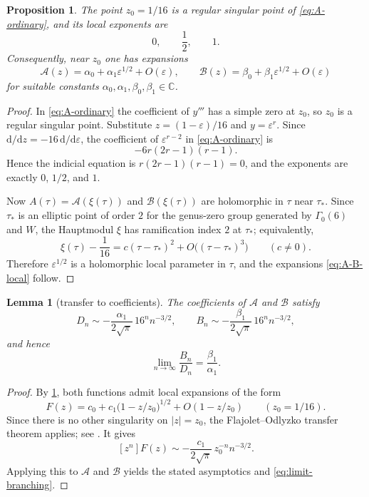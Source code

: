 \documentclass[11pt]{amsart}
\newtheorem{proposition}[theorem]{Proposition}
\newtheorem{lemma}[theorem]{Lemma}
\theoremstyle{definition}
\theoremstyle{remark}
\newcommand{\C}{\mathbb{C}}
\newcommand{\dd}{\mathrm{d}}
\begin{document}
\begin{proposition}\label{prop:local-exponents}
The point $z_0=1/16$ is a regular singular point of \eqref{eq:A-ordinary}, and its local exponents are
\[
0,\qquad \frac12,\qquad 1.
\]
Consequently, near $z_0$ one has expansions
\begin{equation}\label{eq:A-B-local}
\mathcal A(z)=\alpha_0+\alpha_1\varepsilon^{1/2}+O(\varepsilon),
\qquad
\mathcal B(z)=\beta_0+\beta_1\varepsilon^{1/2}+O(\varepsilon)
\end{equation}
for suitable constants $\alpha_0,\alpha_1,\beta_0,\beta_1\in\C$.
\end{proposition}

\begin{proof}
In \eqref{eq:A-ordinary} the coefficient of $y'''$ has a simple zero at $z_0$, so $z_0$ is a regular singular point. Substitute $z=(1-\varepsilon)/16$ and $y=\varepsilon^r$. Since $\dd/\dd z=-16\,\dd/\dd\varepsilon$, the coefficient of $\varepsilon^{r-2}$ in \eqref{eq:A-ordinary} is
\[
-6r(2r-1)(r-1).
\]
Hence the indicial equation is $r(2r-1)(r-1)=0$, and the exponents are exactly $0$, $1/2$, and $1$.

Now $A(\tau)=\mathcal A(\xi(\tau))$ and $\mathcal B(\xi(\tau))$ are holomorphic in $\tau$ near $\tau_*$. Since $\tau_*$ is an elliptic point of order $2$ for the genus-zero group generated by $\Gamma_0(6)$ and $W$, the Hauptmodul $\xi$ has ramification index $2$ at $\tau_*$; equivalently,
\begin{equation}\label{eq:ramification}
\xi(\tau)-\frac{1}{16}=c(\tau-\tau_*)^2+O\bigl((\tau-\tau_*)^3\bigr)
\qquad(c\ne 0).
\end{equation}
Therefore $\varepsilon^{1/2}$ is a holomorphic local parameter in $\tau$, and the expansions \eqref{eq:A-B-local} follow.
\end{proof}

\begin{lemma}[transfer to coefficients]\label{lem:transfer}
The coefficients of $\mathcal A$ and $\mathcal B$ satisfy
\[
D_n\sim -\frac{\alpha_1}{2\sqrt\pi}\,16^n n^{-3/2},
\qquad
B_n\sim -\frac{\beta_1}{2\sqrt\pi}\,16^n n^{-3/2},
\]
and hence
\begin{equation}\label{eq:limit-branching}
\lim_{n\to\infty}\frac{B_n}{D_n}=\frac{\beta_1}{\alpha_1}.
\end{equation}
\end{lemma}

\begin{proof}
By \cref{prop:local-exponents}, both functions admit local expansions of the form
\[
F(z)=c_0+c_1\bigl(1-z/z_0\bigr)^{1/2}+O(1-z/z_0)
\qquad(z_0=1/16).
\]
Since there is no other singularity on $|z|=z_0$, the Flajolet--Odlyzko transfer theorem applies; see \cite[Theorem~VI.1]{FlajoletSedgewick}. It gives
\[
[z^n]F(z)\sim -\frac{c_1}{2\sqrt\pi}\,z_0^{-n}n^{-3/2}.
\]
Applying this to $\mathcal A$ and $\mathcal B$ yields the stated asymptotics and \eqref{eq:limit-branching}.
\end{proof}
\end{document}
